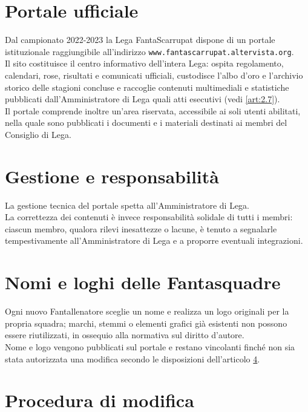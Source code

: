 \section{Portale ufficiale}
\label{art:11.1}

Dal campionato 2022-2023 la Lega FantaScarrupat dispone di un portale istituzionale raggiungibile all'indirizzo \texttt{www.fantascarrupat.altervista.org}.\\
Il sito costituisce il centro informativo dell'intera Lega: ospita regolamento, calendari, rose, risultati e comunicati ufficiali, custodisce l'albo d'oro e l'archivio storico delle stagioni concluse e raccoglie contenuti multimediali e statistiche pubblicati dall'Amministratore di Lega quali atti esecutivi (vedi \ref{art:2.7}).\\
Il portale comprende inoltre un'area riservata, accessibile ai soli utenti abilitati, nella quale sono pubblicati i documenti e i materiali destinati ai membri del Consiglio di Lega.

\section{Gestione e responsabilità}
\label{art:11.2}

La gestione tecnica del portale spetta all'Amministratore di Lega.\\
La correttezza dei contenuti è invece responsabilità solidale di tutti i membri: ciascun membro, qualora rilevi inesattezze o lacune, è tenuto a segnalarle tempestivamente all'Amministratore di Lega e a proporre eventuali integrazioni.

\section{Nomi e loghi delle Fantasquadre}
\label{art:11.3}

Ogni nuovo Fantallenatore sceglie un nome e realizza un logo originali per la propria squadra; marchi, stemmi o elementi grafici già esistenti non possono essere riutilizzati, in ossequio alla normativa sul diritto d'autore.\\
Nome e logo vengono pubblicati sul portale e restano vincolanti finché non sia stata autorizzata una modifica secondo le disposizioni dell'articolo \ref{art:11.4}.

\section{Procedura di modifica}
\label{art:11.4}

